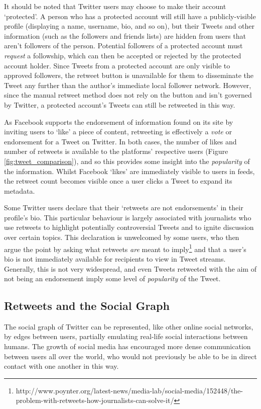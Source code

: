 It should be noted that Twitter users may choose to make their account `protected'. A person who has a protected account will still have a publicly-visible profile (displaying a name, username, bio, and so on), but their Tweets and other information (such as the followers and friends lists) are hidden from users that aren't followers of the person. Potential followers of a protected account must \textit{request} a followship, which can then be accepted or rejected by the protected account holder. Since Tweets from a protected account are only visible to approved followers, the retweet button is unavailable for them to disseminate the Tweet any further than the author's immediate local follower network. However, since the manual retweet method does not rely on the button and isn't governed by Twitter, a protected account's Tweets can still be retweeted in this way.

As Facebook supports the endorsement of information found on its site by inviting users to `like' a piece of content, retweeting is effectively a \textit{vote} or endorsement for a Tweet on Twitter. In both cases, the number of likes and number of retweets is available to the platforms' respective users (Figure \ref{fig:tweet_comparison}), and so this provides some insight into the \textit{popularity} of the information. Whilst Facebook `likes' are immediately visible to users in feeds, the retweet count becomes visible once a user clicks a Tweet to expand its metadata.

Some Twitter users declare that their `retweets are not endorsements' in their profile's bio. This particular behaviour is largely associated with journalists who use retweets to highlight potentially controversial Tweets and to ignite discussion over certain topics. This declaration is unwelcomed by some users, who then argue the point by asking what retweets \textit{are} meant to imply\footnote{http://www.poynter.org/latest-news/media-lab/social-media/152448/the-problem-with-retweets-how-journalists-can-solve-it/} and that a user's bio is not immediately available for recipients to view in Tweet streams. Generally, this is not very widespread, and even Tweets retweeted with the aim of not being an endorsement imply some level of \textit{popularity} of the Tweet. 


\subsection{Retweets and the Social Graph}
The social graph of Twitter can be represented, like other online social networks, by edges between users, partially emulating real-life social interactions between humans. The growth of social media has encouraged more dense communication between users all over the world, who would not previously be able to be in direct contact with one another in this way.

